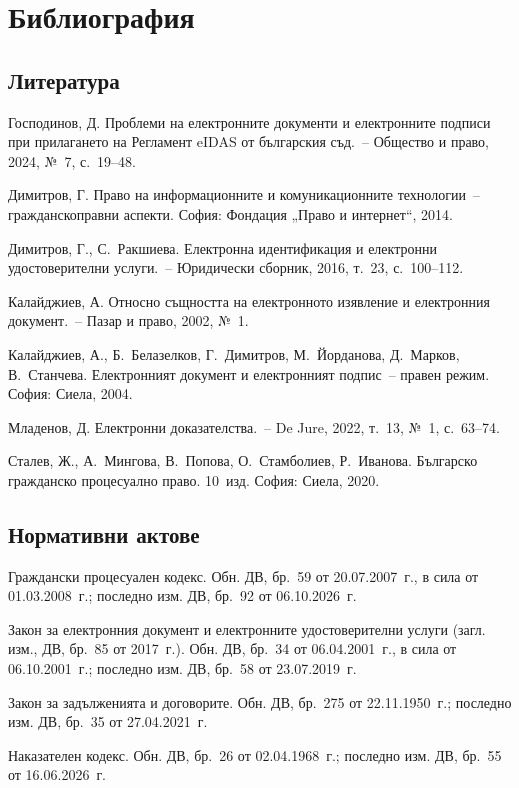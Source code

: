 \clearpage
\section*{Библиография}
\label{sec:bibliografiya}

{\small

\subsection*{Литература}
\begin{biblist}[series=bib]
\item Господинов, Д. Проблеми на електронните документи и електронните подписи при
  прилагането на Регламент eIDAS от българския съд.~-- Общество и право, 2024, №~7,
  с.~19--48.
\item Димитров, Г. Право на информационните и комуникационните технологии~--
  гражданскоправни аспекти. София: Фондация „Право и интернет“, 2014.
\item Димитров, Г., С.~Ракшиева. Електронна идентификация и електронни удостоверителни
  услуги.~-- Юридически сборник, 2016, т.~23, с.~100--112.
\item Калайджиев, А. Относно същността на електронното изявление и електронния
  документ.~-- Пазар и право, 2002, №~1.
\item Калайджиев, А., Б.~Белазелков, Г.~Димитров, М.~Йорданова, Д.~Марков, В.~Станчева.
  Електронният документ и електронният подпис~-- правен режим. София: Сиела, 2004.
\item Младенов, Д. Електронни доказателства.~-- De Jure, 2022, т.~13, №~1, с.~63--74.
\item Сталев, Ж., А.~Мингова, В.~Попова, О.~Стамболиев, Р.~Иванова. Българско гражданско
  процесуално право. 10~изд. София: Сиела, 2020.
\end{biblist}

\subsection*{Нормативни актове}
\begin{biblist}[resume*=bib]
\item Граждански процесуален кодекс. Обн. ДВ, бр.~59 от 20.07.2007~г., в сила от
  01.03.2008~г.; последно изм. ДВ, бр.~92 от 06.10.2026~г.
\item Закон за електронния документ и електронните удостоверителни услуги (загл. изм.,
  ДВ, бр.~85 от 2017~г.). Обн. ДВ, бр.~34 от 06.04.2001~г., в сила от 06.10.2001~г.;
  последно изм. ДВ, бр.~58 от 23.07.2019~г.
\item Закон за задълженията и договорите. Обн. ДВ, бр.~275 от 22.11.1950~г.; последно изм.
  ДВ, бр.~35 от 27.04.2021~г.
\item Наказателен кодекс. Обн. ДВ, бр.~26 от 02.04.1968~г.; последно изм. ДВ, бр.~55 от
  16.06.2026~г.
\end{biblist}

}
